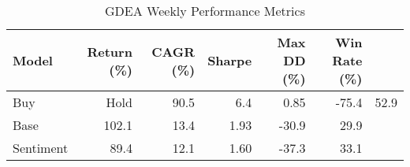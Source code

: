 \begin{table}[h]
\centering
\caption{GDEA Weekly Performance Metrics}
\begin{tabular}{lrrrrr}
\hline
Model & Return (\%) & CAGR (\%) & Sharpe & Max DD (\%) & Win Rate (\%) \\
\hline
Buy&Hold & 90.5 & 6.4 & 0.85 & -75.4 & 52.9 \\
Base & 102.1 & 13.4 & 1.93 & -30.9 & 29.9 \\
Sentiment & 89.4 & 12.1 & 1.60 & -37.3 & 33.1 \\
\hline
\end{tabular}
\end{table}